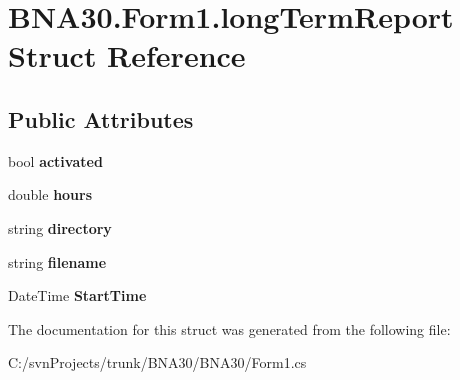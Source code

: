 \hypertarget{struct_b_n_a30_1_1_form1_1_1long_term_report}{}\section{B\+N\+A30.\+Form1.\+long\+Term\+Report Struct Reference}
\label{struct_b_n_a30_1_1_form1_1_1long_term_report}
\subsection*{Public Attributes}
\begin{DoxyCompactItemize}
\item 
\mbox{\label{struct_b_n_a30_1_1_form1_1_1long_term_report_aae435e0c6af2e11e8781b55e29217959}} 
bool {\bfseries activated}
\item 
\mbox{\label{struct_b_n_a30_1_1_form1_1_1long_term_report_afb5ae907b9d3dc50054a34a93cd64163}} 
double {\bfseries hours}
\item 
\mbox{\label{struct_b_n_a30_1_1_form1_1_1long_term_report_a7f66fb710f2e1c55bef6dea2faab22d1}} 
string {\bfseries directory}
\item 
\mbox{\label{struct_b_n_a30_1_1_form1_1_1long_term_report_aaa3d81d6ea74c4b5154ed6ac48e8ee74}} 
string {\bfseries filename}
\item 
\mbox{\label{struct_b_n_a30_1_1_form1_1_1long_term_report_a4dc7f142c760e0f486dd36852276c0ed}} 
Date\+Time {\bfseries Start\+Time}
\end{DoxyCompactItemize}


The documentation for this struct was generated from the following file\+:\begin{DoxyCompactItemize}
\item 
C\+:/svn\+Projects/trunk/\+B\+N\+A30/\+B\+N\+A30/Form1.\+cs\end{DoxyCompactItemize}
